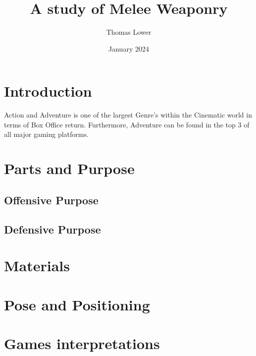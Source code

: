 \documentclass{article}
\title{A study of Melee Weaponry}
\author{Thomas Lower}
\date{January 2024}
\begin{document}
\maketitle

\pagebreak

\tableofcontents

\pagebreak

\section{Introduction}
Action and Adventure is one of the largest Genre's within the Cinematic world in terms of Box Office return\cite{1}. Furthermore, Adventure can be found in the top 3 of all major gaming platforms. 
\pagebreak
\section{Parts and Purpose}

\subsection{Offensive Purpose}

\subsection{Defensive Purpose}

\pagebreak

\section{Materials}

\pagebreak
\section{Pose and Positioning}



\pagebreak

\section{Games interpretations}

\pagebreak


\printbibliography
\end{document}
